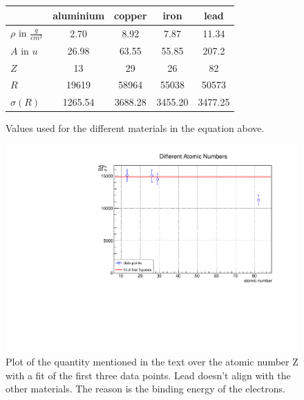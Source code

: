 \newpage

\begin{figure}[h]
\centering
\caption{Values used for the different materials in the equation above.}
\vspace{0.2cm}
\begin{tabular}{lcccc}
 & aluminium  & copper & iron & lead  \\
\hline
\hline
$\rho$ in $\frac{g}{cm^{3}}$ & 2.70 & 8.92 & 7.87 & 11.34 \\
$A$ in $u$ & 26.98 & 63.55 & 55.85 & 207.2 \\
$Z$ & 13 & 29 & 26 & 82 \\
$R$ & 19619 & 58964 & 55038 & 50573 \\
$\sigma (R)$ & 1265.54 & 3688.28 & 3455.20 & 3477.25 \\
\end{tabular}
\end{figure}


\begin{figure}[h]
\centering
\includegraphics[scale=0.5]{./../plots/part_c.pdf}
\caption{Plot of the quantity mentioned in the text over the atomic number Z with a fit of the first three data points. Lead doesn't align with the other materials. The reason is the binding energy of the electrons.}
\end{figure}
